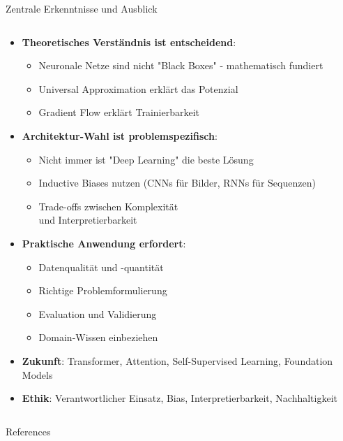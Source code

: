 \documentclass[aspectratio=1610, xcolor=dvipsnames, 9pt]{beamer}
\begin{document}
\begin{frame}{Zentrale Erkenntnisse und Ausblick}
  \begin{columns}
    \begin{column}{1\textwidth}
      \begin{itemize}
        \item \textbf{Theoretisches Verständnis ist entscheidend}:
        \begin{itemize}
          \item Neuronale Netze sind nicht "Black Boxes" - mathematisch fundiert
          \item Universal Approximation erklärt das Potenzial
          \item Gradient Flow erklärt Trainierbarkeit
        \end{itemize}
        \item \textbf{Architektur-Wahl ist problemspezifisch}:
        \begin{itemize}
          \item Nicht immer ist "Deep Learning" die beste Lösung
          \item Inductive Biases nutzen (CNNs für Bilder, RNNs für Sequenzen)
          \item Trade-offs zwischen Komplexität \\
            und Interpretierbarkeit
        \end{itemize}
        \item \textbf{Praktische Anwendung erfordert}:
        \begin{itemize}
          \item Datenqualität und -quantität
          \item Richtige Problemformulierung
          \item Evaluation und Validierung
          \item Domain-Wissen einbeziehen
        \end{itemize}
        \item \textbf{Zukunft}: Transformer, Attention, Self-Supervised Learning, Foundation Models
        \item \textbf{Ethik}: Verantwortlicher Einsatz, Bias, Interpretierbarkeit, Nachhaltigkeit
      \end{itemize}
    \end{column}
  \end{columns}
\end{frame}



\begin{frame}[allowframebreaks]{References}
 
 
\end{frame}
\end{document}
